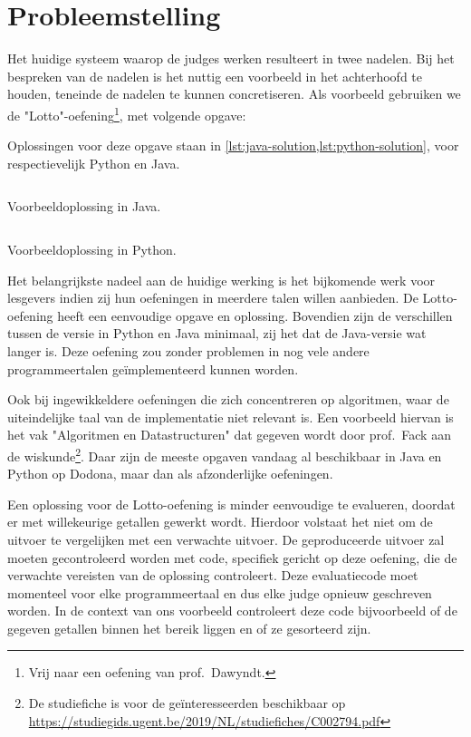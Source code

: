 \section{Probleemstelling}\label{sec:probleemstelling}

Het huidige systeem waarop de judges werken resulteert in twee nadelen.
Bij het bespreken van de nadelen is het nuttig een voorbeeld in het achterhoofd te houden, teneinde de nadelen te kunnen concretiseren.
Als voorbeeld gebruiken we de "Lotto"-oefening\footnote{Vrij naar een oefening van prof.\ Dawyndt.}, met volgende opgave:

\begin{quotation}
\end{quotation}

Oplossingen voor deze opgave staan in \cref{lst:java-solution,lst:python-solution}, voor respectievelijk Python en Java.

\begin{listing}
    \inputminted{java}{code/correct-solution.java}
    \caption{Voorbeeldoplossing in Java.}
    \label{lst:java-solution}
\end{listing}

\begin{listing}
    \inputminted{python3}{code/correct-solution.py}
    \caption{Voorbeeldoplossing in Python.}
    \label{lst:python-solution}
\end{listing}

Het belangrijkste nadeel aan de huidige werking is het bijkomende werk voor lesgevers indien zij hun oefeningen in meerdere talen willen aanbieden.
De Lotto-oefening heeft een eenvoudige opgave en oplossing.
Bovendien zijn de verschillen tussen de versie in Python en Java minimaal, zij het dat de Java-versie wat langer is.
Deze oefening zou zonder problemen in nog vele andere programmeertalen geïmplementeerd kunnen worden.

Ook bij ingewikkeldere oefeningen die zich concentreren op algoritmen, waar de uiteindelijke taal van de implementatie niet relevant is.
Een voorbeeld hiervan is het vak "Algoritmen en Datastructuren" dat gegeven wordt door prof.\ Fack aan de wiskunde\footnote{De studiefiche is voor de geïnteresseerden beschikbaar op \url{https://studiegids.ugent.be/2019/NL/studiefiches/C002794.pdf}}.
Daar zijn de meeste opgaven vandaag al beschikbaar in Java en Python op Dodona, maar dan als afzonderlijke oefeningen.

Een oplossing voor de Lotto-oefening is minder eenvoudige te evalueren, doordat er met willekeurige getallen gewerkt wordt.
Hierdoor volstaat het niet om de uitvoer te vergelijken met een verwachte uitvoer.
De geproduceerde uitvoer zal moeten gecontroleerd worden met code, specifiek gericht op deze oefening, die de verwachte vereisten van de oplossing controleert.
Deze evaluatiecode moet momenteel voor elke programmeertaal en dus elke judge opnieuw geschreven worden.
In de context van ons voorbeeld controleert deze code bijvoorbeeld of de gegeven getallen binnen het bereik liggen en of ze gesorteerd zijn.

